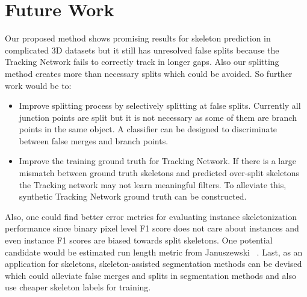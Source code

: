 
\chapter{Future Work}\label{chapter:further_work}
Our proposed method shows promising results for skeleton prediction in complicated 3D datasets but it still has unresolved false splits because the Tracking Network fails to correctly track in longer gaps. Also our splitting method creates more than necessary splits which could be avoided. So further work would be to:
\begin{itemize}
	\item Improve splitting process by selectively splitting at false splits. Currently all junction points are split but it is not necessary as some of them are branch points in the same object. A classifier can be designed to discriminate between false merges and branch points.
	
	\item Improve the training ground truth for Tracking Network. If there is a large mismatch between ground truth skeletons and predicted over-split skeletons the Tracking network may not learn meaningful filters. To alleviate this, synthetic Tracking Network ground truth can be constructed.
	
\end{itemize}

Also, one could find better error metrics for evaluating instance skeletonization performance since binary pixel level F1 score does not care about instances and even instance F1 scores are biased towards split skeletons. One potential candidate would be estimated run length metric from Januszewski \etall~\cite{Januszewski2017FFN, Januszewski2018FFN}.
Last, as an application for skeletons, skeleton-assisted segmentation methods can be devised which could alleviate false merges and splits in segmentation methods and also use cheaper skeleton labels for training.
